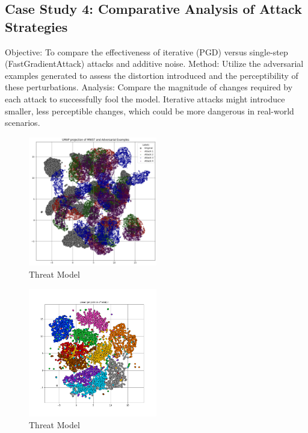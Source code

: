 \documentclass[10pt, conference, a4paper, final]{IEEEtran}
\begin{document}
\subsection{Case Study 4: Comparative Analysis of Attack Strategies}
Objective: To compare the effectiveness of iterative (PGD) versus single-step (FastGradientAttack) attacks and additive noise.
Method: Utilize the adversarial examples generated to assess the distortion introduced and the perceptibility of these perturbations.
Analysis: Compare the magnitude of changes required by each attack to successfully fool the model. Iterative attacks might introduce smaller, less perceptible changes, which could be more dangerous in real-world scenarios.
\begin{figure}[!ht]
    \centering
    \includegraphics[width=0.5\textwidth]{paper_images/UMAP_adversary.png}
    \caption{Threat Model}
    \label{threat model}
    \end{figure}
    \begin{figure}[!ht]
        \centering
        \includegraphics[width=0.5\textwidth]{paper_images/UMAPMNIST.png}
        \caption{Threat Model}
        \label{threat model}
        \end{figure}
\end{document}

